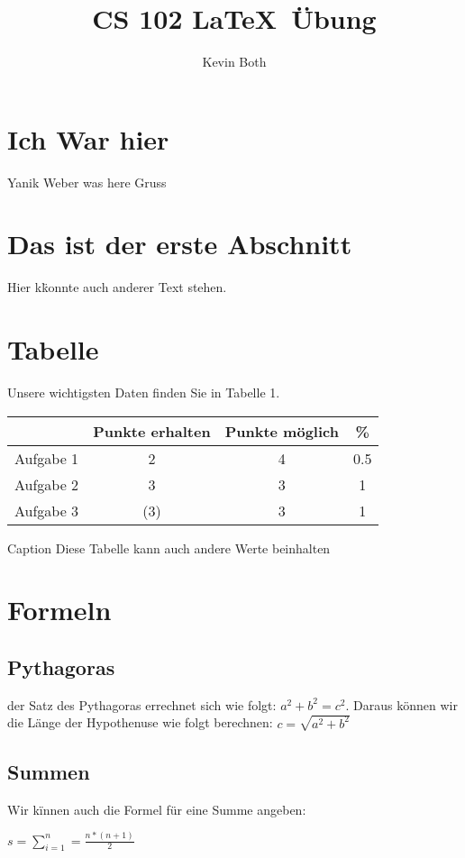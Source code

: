 \documentclass [ ] {article}
\title {CS 102 \LaTeX ~\"Ubung}
\author {Kevin Both}
\begin{document}
\maketitle
\section {Ich War hier}
Yanik Weber was here 
Gruss 

\section{Das ist der erste Abschnitt}
Hier k\"konnte auch anderer Text stehen.
\section{Tabelle}
Unsere wichtigsten Daten finden Sie in Tabelle 1.
\begin{table}[h]
\begin{tabular}{c|c|c|c}
 \textbf{ }&\textbf{Punkte erhalten}&\textbf{Punkte m\"oglich}&\textbf{\%}\\
\hline{Aufgabe 1}& {2} &{4}&{0.5}\\
{Aufgabe 2} &{3} &{3} &{1}\\
{Aufgabe 3} &(3) &{3}&{1}
\end{tabular}
Caption {Diese Tabelle kann auch andere Werte beinhalten}
\end{table}
\section {Formeln}
\subsection {Pythagoras}
der Satz des Pythagoras errechnet sich wie folgt: $ a^{2} +b^{2}=c^{2}$. Daraus k\"onnen wir die L\"ange der Hypothenuse wie folgt berechnen: $c= \sqrt {a^{2}+b^{2}}$
\subsection{Summen}
Wir k\"innen auch die Formel f\"ur eine Summe angeben:\\
\begin {center}

$ s=\sum\limits_{i=1}^{n}=\frac{n*(n+1)}{2}$






\end{center}
\end{document}
